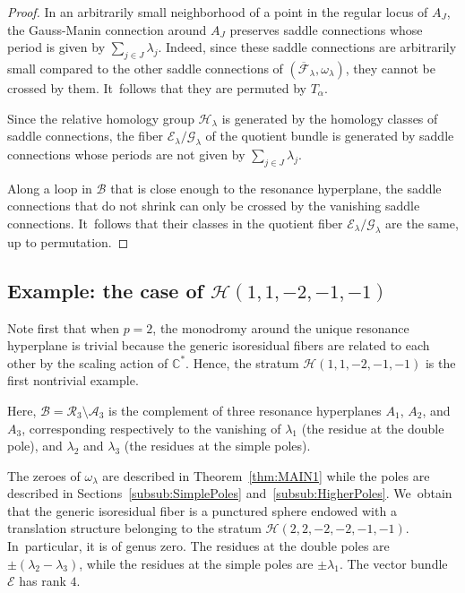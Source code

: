 \documentclass[JEP,XML,SOM,Unicode,NoFloatCountersInSection,published]{cedram}
\newcommand\calH{{\mathcal H}}
\theoremstyle{definition}
\begin{document}
\begin{proof}
In an arbitrarily small neighborhood of a point in the regular locus of $A_{J}$, the Gauss-Manin connection around $A_{J}$ preserves saddle connections whose period is given by $\sum_{j \in J} \lambda_{j}$. Indeed, since these saddle connections are arbitrarily small compared to the other saddle connections of $(\overline{\mathcal{F}}_{\lambda},\omega_{\lambda})$, they cannot be crossed by them. It~follows that they are permuted by $T_{\alpha}$.

Since the relative homology group $\calH_{\lambda}$ is generated by the homology classes of saddle connections, the fiber $\mathcal{E}_{\lambda}/\mathcal{G}_{\lambda}$ of the quotient bundle is generated by saddle connections whose periods are not given by $\sum_{j \in J} \lambda_{j}$.

Along a loop in $\mathcal{B}$ that is close enough to the resonance hyperplane, the saddle connections that do not shrink can only be crossed by the vanishing saddle connections. It~follows that their classes in the quotient fiber $\mathcal{E}_{\lambda}/\mathcal{G}_{\lambda}$ are the same, up to permutation.
\end{proof}

\subsection{Example: the case of $\mathcal{H}(1,1,-2,-1,-1)$}\label{sub:monoExample}

Note first that when $p=2$, the monodromy around the unique resonance hyperplane is trivial because the generic isoresidual fibers are related to each other by the scaling action of $\mathbb{C}^{\ast}$. Hence, the stratum $\mathcal{H}(1,1,-2,-1,-1)$ is the first nontrivial example.

Here, $\mathcal{B} = \mathcal{R}_{3} \setminus \mathcal{A}_{3}$ is the complement of three resonance hyperplanes $A_{1}$, $A_{2}$, and~$A_{3}$, corresponding respectively to the vanishing of $\lambda_{1}$ (the residue at the double pole), and $\lambda_{2}$ and $\lambda_{3}$ (the residues at the simple poles).

The zeroes of $\omega_{\lambda}$ are described in Theorem~\ref{thm:MAIN1} while the poles are described in Sections~\ref{subsub:SimplePoles} and~\ref{subsub:HigherPoles}. We~obtain that the generic isoresidual fiber is a punctured sphere endowed with a translation structure belonging to the stratum $\mathcal{H}(2,2,-2,-2,-1,-1)$. In~particular, it is of genus zero. The residues at the double poles are $\pm (\lambda_{2}-\lambda_{3})$, while the residues at the simple poles are $\pm\lambda_{1}$. The vector bundle $\mathcal{E}$ has rank $4$.
\end{document}

